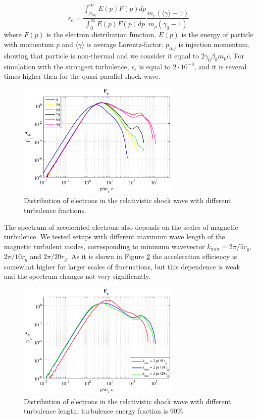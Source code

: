 \documentclass[a4paper]{jpconf}
\begin{document}
\begin{equation}
\epsilon_e = \frac{\int_{p_{inj}}^{\infty}E(p)F(p)dp}{\int_{0}^{\infty}E(p)F(p)dp }\frac{m_e(\langle \gamma \rangle - 1)}{m_p (\gamma_0 - 1)}
\end{equation}
where $F(p)$ is the electron distribution function, $E(p)$ is the energy of particle with momentum $p$ and $\langle \gamma \rangle$ is average Lorentz-factor. $p_{inj}$ is injection momentum, showing that particle is non-thermal and we consider it equal to $2 \gamma_0 \beta_0 m_p c$. For simulation with the strongest turbulence, $\epsilon_e$ is equal to $2\cdot10^{-3}$, and it is several times higher then for the quasi-parallel shock wave.
\begin{figure}[h!]
	\centering
	\includegraphics[width=0.7\textwidth]{fig/spectrum.eps} 
	\caption{Distribution of electrons in the relativistic shock wave with different turbulence fractions.}
	\label{spectrum}
\end{figure} 

The spectrum of accelerated electrons also depends on the scales of magnetic turbulence. We tested setups with different maximum wave length of the magnetic turbulent modes, corresponding to minimum wavevector $k_{min} = 2 \pi / 5 r_g$, $2 \pi / 10 r_g$ and $ 2 \pi /20 r_g$. As it is shown in Figure \ref{spectrum_length} the acceleration efficiency is somewhat higher for larger scales of fluctuations, but this dependence is weak and the spectrum changes not very significantly.

\begin{figure}[h!]
	\centering
	\includegraphics[width=0.7\textwidth]{fig/spectrum_length.eps} 
	\caption{Distribution of electrons in the relativistic shock wave with different turbulence length, turbulence energy fraction is 90\%.}
	\label{spectrum_length}
\end{figure} 
\end{document}
